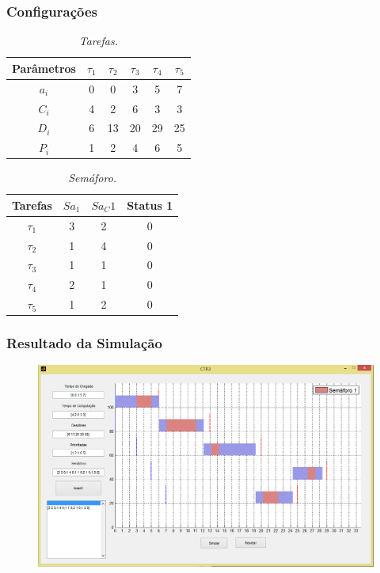 \subsubsection{Configurações}
\begin{table}[H]
\centering
\caption{\em Tarefas.}
\vspace{0.1cm}
\begin{tabular}{c||c|c|c|c|c}
 
Parâmetros & $\tau_1$ & $\tau_2$ & $\tau_3$ & $\tau_4$ & $\tau_5$\\ 
\hline 
                          
$a_i$ & 0 & 0 & 3 & 5 & 7\\ 
$C_i$ & 4 & 2 & 6 & 3 & 3\\ 
$D_i$ & 6 & 13 & 20 & 29 & 25\\
$P_i$ & 1 & 2 & 4 & 6 & 5
 
\end{tabular}
\end{table}

\begin{table}[H]
\centering
\caption{\em Semáforo.}
\vspace{0.1cm}
\begin{tabular}{c||c|c|c}
 
Tarefas & $Sa_1$ & $Sa_C1$ & Status 1\\ 
\hline 
                          
$\tau_1$ & 3 & 2 & 0\\ 
$\tau_2$ & 1 & 4 & 0\\
$\tau_3$ & 1 & 1 & 0\\
$\tau_4$ & 2 & 1 & 0\\
$\tau_5$ & 1 & 2 & 0
 
\end{tabular}
\end{table}

\subsubsection{Resultado da Simulação}

\begin{figure}[H]
	\centering
	\includegraphics[keepaspectratio,width=1\textwidth]{img/teste3.png}
\end{figure}



